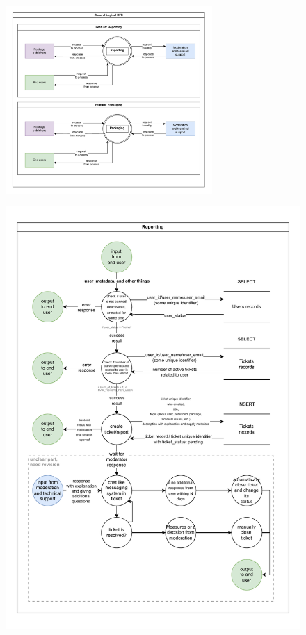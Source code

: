 \documentclass[letterpaper,12pt]{report}
\begin{document}
\begin{figure}[htpb!]
    \centering
    \includegraphics[width=0.7\textwidth]{figure_4}
    \caption[General logical DFD]
    \label{fig:figure4}
\end{figure}

\begin{figure}[htpb!]
    \centering
    \includegraphics[width=1\textwidth]{figure_5}
    \caption[Feature: Reporting]
    \label{fig:figure5}
\end{figure}
\end{document}

